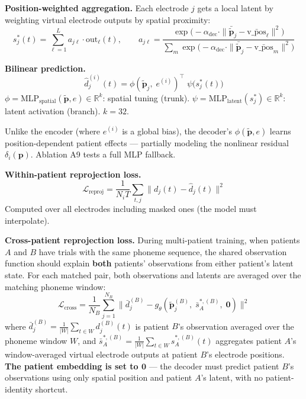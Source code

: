 \documentclass[11pt,letterpaper]{article}
\newcommand{\bfp}{\mathbf{p}}
\newcommand{\R}{\mathbb{R}}
\begin{document}
\textbf{Position-weighted aggregation.} Each electrode $j$ gets a local latent by weighting virtual electrode outputs by spatial proximity:
\begin{equation}
s_j^*(t) = \sum_{\ell=1}^{L} a_{j\ell} \cdot \text{out}_\ell(t), \qquad
a_{j\ell} = \frac{\exp\bigl(-\alpha_{\text{dec}} \cdot \|\bar{\tilde{\bfp}}_j - \bar{\text{v\_pos}}_\ell\|^2\bigr)}
             {\sum_{m} \exp\bigl(-\alpha_{\text{dec}} \cdot \|\bar{\tilde{\bfp}}_j - \bar{\text{v\_pos}}_m\|^2\bigr)}
\end{equation}

\textbf{Bilinear prediction.}
\begin{equation}\label{eq:bilinear}
\hat{d}_j^{(i)}(t) = \phi(\tilde{\bfp}_j,\; e^{(i)})^\top \;\psi\bigl(s_j^*(t)\bigr)
\end{equation}
$\phi = \text{MLP}_{\text{spatial}}(\tilde{\bfp}, e) \in \R^k$: spatial tuning (trunk). $\psi = \text{MLP}_{\text{latent}}(s_j^*) \in \R^k$: latent activation (branch). $k{=}32$.

Unlike the encoder (where $e^{(i)}$ is a global bias), the decoder's $\phi(\tilde{\bfp}, e)$ learns position-dependent patient effects --- partially modeling the nonlinear residual $\delta_i(\bfp)$. Ablation A9 tests a full MLP fallback.

\textbf{Within-patient reprojection loss.}
\begin{equation}
\mathcal{L}_{\text{reproj}} = \frac{1}{N_i T} \sum_{t,j} \bigl\| d_j(t) - \hat{d}_j(t) \bigr\|^2
\end{equation}
Computed over all electrodes including masked ones (the model must interpolate).

\textbf{Cross-patient reprojection loss.}\label{sec:cross-reproj}
During multi-patient training, when patients $A$ and $B$ have trials with the same phoneme sequence, the shared observation function should explain \textbf{both} patients' observations from either patient's latent state. For each matched pair, both observations and latents are averaged over the matching phoneme window:
\begin{equation}
\mathcal{L}_{\text{cross}} = \frac{1}{N_B} \sum_{j=1}^{N_B} \bigl\| \bar{d}_j^{(B)} - g_\theta(\tilde{\bfp}_j^{(B)},\; \bar{s}_A^{*,(B)},\; \mathbf{0}) \bigr\|^2
\end{equation}
where $\bar{d}_j^{(B)} = \tfrac{1}{|W|}\sum_{t \in W} d_j^{(B)}(t)$ is patient $B$'s observation averaged over the phoneme window $W$, and $\bar{s}_A^{*,(B)} = \tfrac{1}{|W|}\sum_{t \in W} s_A^{*,(B)}(t)$ aggregates patient $A$'s window-averaged virtual electrode outputs at patient $B$'s electrode positions. \textbf{The patient embedding is set to $\mathbf{0}$} --- the decoder must predict patient $B$'s observations using only spatial position and patient $A$'s latent, with no patient-identity shortcut.
\end{document}
